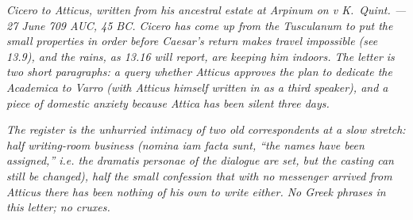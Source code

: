 
\textit{Cicero to Atticus, written from his ancestral
estate at Arpinum on \textit{v K.\ Quint.} --- 27 June
709 AUC, 45 BC. Cicero has come up from the
Tusculanum to put the small properties in order
before Caesar's return makes travel impossible (see
13.9), and the rains, as 13.16 will report, are
keeping him indoors. The letter is two short
paragraphs: a query whether Atticus approves the
plan to dedicate the \textit{Academica} to Varro
(with Atticus himself written in as a third
speaker), and a piece of domestic anxiety because
Attica has been silent three days.}

\textit{The register is the unhurried intimacy of two old
correspondents at a slow stretch: half writing-room
business (\textit{nomina iam facta sunt}, ``the names
have been assigned,'' i.e. the dramatis personae of
the dialogue are set, but the casting can still be
changed), half the small confession that with no
messenger arrived from Atticus there has been
nothing of his own to write either. No Greek phrases
in this letter; no cruxes.}
